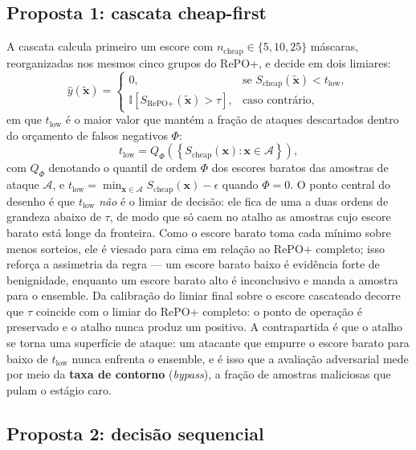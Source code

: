 \documentclass[conference]{IEEEtran}
\begin{document}
\subsection{Proposta 1: cascata cheap-first}

A cascata calcula primeiro um escore com $n_{\text{cheap}} \in \{5, 10, 25\}$ máscaras, reorganizadas nos mesmos cinco grupos do RePO+, e decide em dois limiares:
\begin{equation}
\hat{y}(\tilde{\mathbf{x}}) =
\begin{cases}
0, & \text{se } S_{\text{cheap}}(\tilde{\mathbf{x}}) < t_{\text{low}}, \\
\mathbb{I}\left[S_{\text{RePO+}}(\tilde{\mathbf{x}}) > \tau\right], & \text{caso contrário},
\end{cases}
\label{eq:cascata}
\end{equation}
em que $t_{\text{low}}$ é o maior valor que mantém a fração de ataques descartados dentro do orçamento de falsos negativos $\Phi$:
\begin{equation}
t_{\text{low}} = Q_{\Phi}\!\left(\left\{ S_{\text{cheap}}(\mathbf{x}) : \mathbf{x} \in \mathcal{A} \right\}\right),
\label{eq:t_low}
\end{equation}
com $Q_{\Phi}$ denotando o quantil de ordem $\Phi$ dos escores baratos das amostras de ataque $\mathcal{A}$, e $t_{\text{low}} = \min_{\mathbf{x} \in \mathcal{A}} S_{\text{cheap}}(\mathbf{x}) - \epsilon$ quando $\Phi = 0$.
O ponto central do desenho é que $t_{\text{low}}$ \emph{não} é o limiar de decisão: ele fica de uma a duas ordens de grandeza abaixo de $\tau$, de modo que só caem no atalho as amostras cujo escore barato está longe da fronteira.
Como o escore barato toma cada mínimo sobre menos sorteios, ele é viesado para cima em relação ao RePO+ completo; isso reforça a assimetria da regra — um escore barato baixo é evidência forte de benignidade, enquanto um escore barato alto é inconclusivo e manda a amostra para o ensemble.
Da calibração do limiar final sobre o escore cascateado decorre que $\tau$ coincide com o limiar do RePO+ completo: o ponto de operação é preservado e o atalho nunca produz um positivo.
A contrapartida é que o atalho se torna uma superfície de ataque: um atacante que empurre o escore barato para baixo de $t_{\text{low}}$ nunca enfrenta o ensemble, e é isso que a avaliação adversarial mede por meio da \textbf{taxa de contorno} (\textit{bypass}), a fração de amostras maliciosas que pulam o estágio caro.

\subsection{Proposta 2: decisão sequencial}
\end{document}
